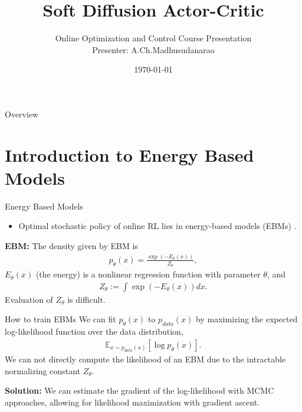 \documentclass[aspectratio=169,xcolor=dvipsnames]{beamer}
\title{Soft Diffusion Actor-Critic}
\subtitle{ }
\author{Online Optimization and Control Course  Presentation\\
Presenter: A.Ch.Madhusudanarao}
\institute
{
    Department of Electrical Communication Engineering \\
    IISc-Bangalore %
}
\date{\today} %
\newcommand{\bE}{\mathbb{E}}
\newcommand{\te}{\theta}
\newcommand{\nal}[1]{\begin{align*}#1\end{align*}}
\begin{document}
\begin{frame}
    \titlepage
\end{frame}

\begin{frame}{Overview}
    \tableofcontents
\end{frame}

\section{Introduction to Energy Based Models}

\begin{frame}{Energy Based Models}
    \begin{itemize}
        \item Optimal stochastic policy of online RL lies in energy-based models (EBMs) \cite{haarnoja2017reinforcement}.
    \end{itemize}
    \textbf{EBM:} 
    The density given by EBM is
    \nal{
        p_{\te}(x) = \frac{\exp(-E_{\te}(x))}{Z_{\te}},
    }
    $E_{\te}(x)$ (the energy) is a nonlinear regression function with parameter $\te$, and 
    \nal{
        Z_{\te} := \int \exp(-E_{\te}(x)) dx.
    } 
    \alert{Evaluation of $Z_{\te}$ is difficult.}
\end{frame}


\begin{frame}{How to train EBMs \cite{song2021train}}
 We can fit $p_{\te}(x)$ to $p_{data}(x)$ by maximizing
 the expected log-likelihood function over the data distribution, 
 \nal{
    \bE_{x\sim p_{data}(x)}\left[\log p_{\te}(x)\right].
 }
 \alert{We can not directly compute the likelihood of an EBM due to the intractable normalizing constant $Z_{\te}$.}

\textbf{Solution:} We can estimate
 the gradient of the log-likelihood with MCMC approaches, allowing for likelihood maximization with gradient ascent.
\end{frame}
\end{document}
